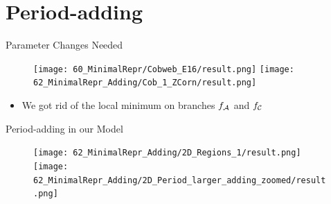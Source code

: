 \section{Period-adding}

\begin{frame}{Parameter Changes Needed}
	\vspace{-1em}
	\begin{figure}
		\texttt{[image: 60\_MinimalRepr/Cobweb\_E16/result.png]}
		\texttt{[image: 62\_MinimalRepr\_Adding/Cob\_1\_ZCorn/result.png]}
	\end{figure}
	\begin{itemize}
		\item We got rid of the local minimum on branches $f_{\mathcal{A}}$ and $f_{\mathcal{C}}$
	\end{itemize}
\end{frame}

\begin{frame}{Period-adding in our Model}
	\begin{figure}
		\texttt{[image: 62\_MinimalRepr\_Adding/2D\_Regions\_1/result.png]}
		\quad
		\texttt{[image: 62\_MinimalRepr\_Adding/2D\_Period\_larger\_adding\_zoomed/result.png]}
	\end{figure}
\end{frame}

